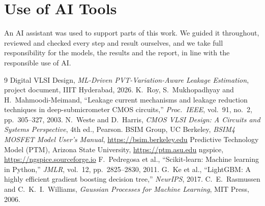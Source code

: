 \documentclass[11pt,a4paper]{article}
\begin{document}
\section*{Use of AI Tools}

An AI assistant was used to support parts of this work. We guided it throughout, reviewed and checked
every step and result ourselves, and we take full responsibility for the models, the results and the
report, in line with the responsible use of AI.

\begin{thebibliography}{9}
Digital VLSI Design, \emph{ML-Driven PVT-Variation-Aware Leakage Estimation}, project document,
IIIT Hyderabad, 2026.
K.~Roy, S.~Mukhopadhyay and H.~Mahmoodi-Meimand, ``Leakage current mechanisms and leakage reduction
techniques in deep-submicrometer CMOS circuits,'' \emph{Proc.\ IEEE}, vol.~91, no.~2, pp.~305--327, 2003.
N.~Weste and D.~Harris, \emph{CMOS VLSI Design: A Circuits and Systems Perspective}, 4th ed., Pearson.
BSIM Group, UC Berkeley, \emph{BSIM4 MOSFET Model User's Manual}, \url{https://bsim.berkeley.edu}
Predictive Technology Model (PTM), Arizona State University, \url{https://ptm.asu.edu}
ngspice, \url{https://ngspice.sourceforge.io}
F.~Pedregosa et al., ``Scikit-learn: Machine learning in Python,'' \emph{JMLR}, vol.~12, pp.~2825--2830, 2011.
G.~Ke et al., ``LightGBM: A highly efficient gradient boosting decision tree,'' \emph{NeurIPS}, 2017.
C.~E.~Rasmussen and C.~K.~I.~Williams, \emph{Gaussian Processes for Machine Learning}, MIT Press, 2006.
\end{thebibliography}
\end{document}
